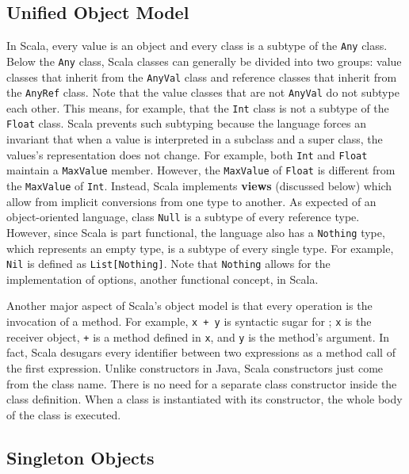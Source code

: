 \documentclass[jou,apacite]{IEEEtran}
\begin{document}
\subsection{Unified Object Model}
\label{sec:unified-object-model}




In Scala, every value is an object and every class is a subtype of the
\texttt{Any} class. Below the \texttt{Any} class, Scala classes can generally be
divided into two groups: value classes that inherit from the \texttt{AnyVal}
class and reference classes that inherit from the \texttt{AnyRef} class. Note
that the value classes that are not \texttt{AnyVal} do not subtype each
other. This means, for example, that the \texttt{Int} class is not a subtype of
the \texttt{Float} class. Scala prevents such subtyping because the language
forces an invariant that when a value is interpreted in a subclass and a super
class, the values's representation does not change. For example, both
\texttt{Int} and \texttt{Float} maintain a \texttt{MaxValue} member. However,
the \texttt{MaxValue} of \texttt{Float} is different from the \texttt{MaxValue}
of \texttt{Int}. Instead, Scala implements \textbf{views} (discussed below)
which allow from implicit conversions from one type to another. As expected of
an object-oriented language, class \texttt{Null} is a subtype of every reference
type. However, since Scala is part functional, the language also has a
\texttt{Nothing} type, which represents an empty type, is a subtype of every
single type. For example, \texttt{Nil} is defined as
\texttt{List[Nothing]}. Note that \texttt{Nothing} allows for the implementation
of options, another functional concept, in Scala.

Another major aspect of Scala's object model is that every operation is the
invocation of a method. For example, \texttt{x + y} is syntactic sugar for
; \texttt{x} is the receiver object, \texttt{+} is a method defined
in \texttt{x}, and \texttt{y} is the method's argument. In fact, Scala desugars
every identifier between two expressions as a method call of the first
expression. Unlike constructors in Java, Scala constructors just come from the
class name. There is no need for a separate class constructor inside the class
definition. When a class is instantiated with its constructor, the whole body of
the class is executed.

\subsection{Singleton Objects}
\label{sec:singleton-objects}
\end{document}
